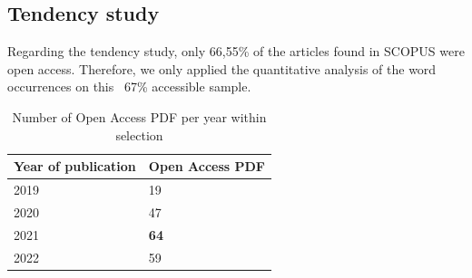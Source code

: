 \documentclass[runningheads]{llncs}
\begin{document}
\subsection{Tendency study}
Regarding the tendency study, only 66,55\% of the articles found in SCOPUS were open access. Therefore, we only applied the quantitative analysis of the word occurrences on this ~67\% accessible sample.
\begin{table}
\caption{Number of Open Access PDF per year within selection}\label{tab2}
\centering
\begin{tabular}{|l|l|}
\hline
Year of publication & Open Access PDF\\
\hline
2019 & 19 \\
2020 & 47 \\
2021 & \textbf{64} \\
2022 & 59 \\
\hline
\end{tabular}
\end{table}
\end{document}
